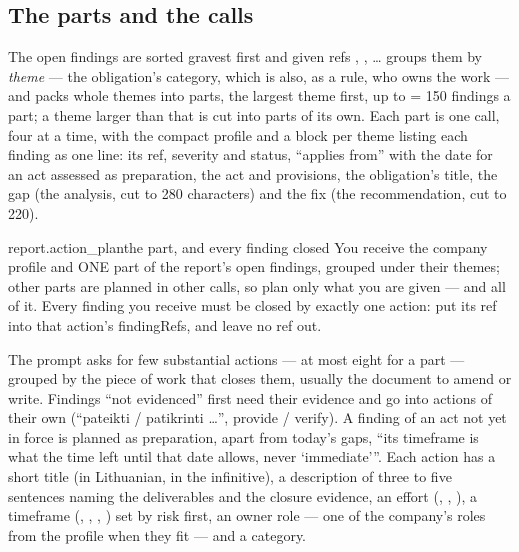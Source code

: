 \subsection{The parts and the calls}

The open findings are sorted gravest first and given refs , , \ldots{}
 groups them by \emph{theme} --- the obligation's category, which is also, as
a rule, who owns the work --- and packs whole themes into parts, the largest theme first, up to
 = 150 findings a part; a theme larger than that is cut into parts
of its own. Each part is one call, four at a time, with the compact profile and a block per
theme listing each finding as one line: its ref, severity and status, \enquote{applies from}
with the date for an act assessed as preparation, the act and provisions, the obligation's
title, the gap (the analysis, cut to 280 characters) and the fix (the recommendation, cut to
220).

\begin{promptexcerpt}{report.action_plan}{the part, and every finding closed}
  You receive the company profile and ONE part of the report's open findings, grouped
  under their themes; other parts are planned in other calls, so plan only what you
  are given — and all of it. Every finding you receive must be closed by exactly one
  action: put its ref into that action's findingRefs, and leave no ref out.
\end{promptexcerpt}

The prompt asks for few substantial actions --- at most eight for a part --- grouped by the piece
of work that closes them, usually the document to amend or write. Findings \enquote{not
evidenced} first need their evidence and go into actions of their own (\enquote{pateikti /
patikrinti \ldots}, provide / verify). A finding of an act not yet in force is planned as
preparation, apart from today's gaps, \enquote{its timeframe is what the time left until that
date allows, never \enquote{immediate}}. Each action has a short title (in Lithuanian, in the
infinitive), a
description of three to five sentences naming the deliverables and the closure evidence, an
effort (, , ), a timeframe (,
, , ) set by risk first, an owner role --- one of
the company's roles from the profile when they fit --- and a category.

